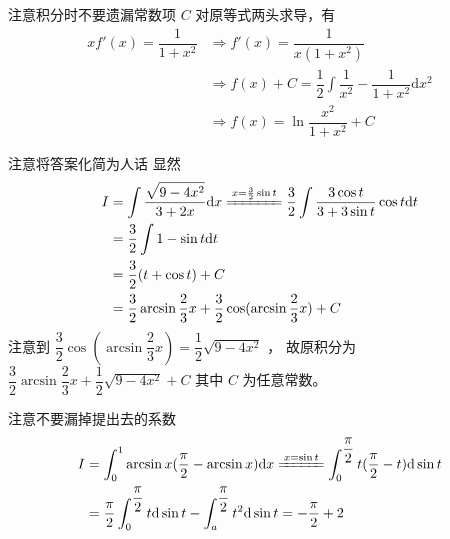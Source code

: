 \begin{answer}[660T51]{注意积分时不要遗漏常数项 $ C $ }
    对原等式两头求导，有
    \begin{equation*}
        \begin{aligned}
            xf'(x) = \dfrac{1}{1+x^2} &\Rightarrow f'(x) = \dfrac{1}{x(1+x^2)}
            \\&\Rightarrow f(x) + C = \dfrac{1}{2} \int \dfrac{1}{x^2} - \dfrac{1}{1+x^2} \mathrm{d}x^2
            \\&\Rightarrow f(x) = \ln\dfrac{x^2}{1+x^2} + C
        \end{aligned}
    \end{equation*}
\end{answer}

\begin{answer}[660T52]{注意将答案化简为人话}
    显然\begin{equation*}
        \begin{aligned}
            I & = \int \dfrac{\dsqrt{9-4x^2}}{3+2x}\mathrm{d}x 
            \xlongequal{x = \frac{3}{2}\sin t} \dfrac{3}{2}
            \int \dfrac{3\cos t}{3+3\sin t} \cos t\mathrm{d}t
            \\&= \dfrac{3}{2}\int 1 - \sin t\mathrm{d}t \\&=
            \dfrac{3}{2}(t + \cos t) + C 
            \\&= \dfrac{3}{2}\arcsin \dfrac{2}{3}x + \dfrac{3}{2}\cos (\arcsin \dfrac{2}{3}x) + C
        \end{aligned}
    \end{equation*}
    注意到 $ \dfrac{3}{2}\cos (\arcsin \dfrac{2}{3}x) = \dfrac{1}{2}\sqrt{9-4x^2} $ ，
    故原积分为 $ \dfrac{3}{2}\arcsin \dfrac{2}{3}x + \dfrac{1}{2}\sqrt{9-4x^2} + C $ 
    其中 $ C $ 为任意常数。
\end{answer}

\begin{answer}[660T59]{注意不要漏掉提出去的系数}
    \begin{equation*}
        \begin{aligned}
            I &= \int_0^1 \arcsin x (\dfrac{\pi}{2} - \arcsin x) \mathrm{d} x 
            \xlongequal{x = \sin t} \int_0^{\dfrac{\pi}{2}}
            t(\dfrac{\pi}{2} - t) \mathrm{d} \sin t
            \\&= \dfrac{\pi}{2}\int_0^{\dfrac{\pi}{2}} t\mathrm{d}\sin t
            - \int_a^{\dfrac{\pi}{2}} t^2 \mathrm{d}\sin t
            = - \dfrac{\pi}{2} + 2
        \end{aligned}
    \end{equation*}
\end{answer}


